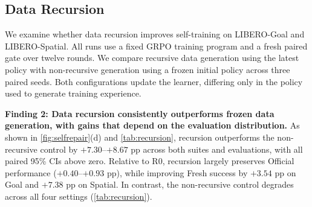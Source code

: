 \subsection{Data Recursion}
\label{sec:rq2}
We examine whether data recursion improves self-training on LIBERO-Goal and LIBERO-Spatial. All runs use a fixed GRPO training program and a fresh paired gate over twelve rounds. We compare recursive data generation using the latest policy with non-recursive generation using a frozen initial policy across three paired seeds. Both configurations update the learner, differing only in the policy used to generate training experience.

\indent\textbf{Finding 2: Data recursion consistently
outperforms frozen data generation, with gains that
depend on the evaluation distribution.}
As shown in \cref{fig:selfrepair}(d) and
\cref{tab:recursion}, recursion outperforms the
non-recursive control by $+7.30$--$+8.67$ pp across
both suites and evaluations, with all paired 95\% CIs
above zero. Relative to R0, recursion largely preserves
Official performance ($+0.40$--$+0.93$ pp), while
improving Fresh success by $+3.54$ pp on Goal and
$+7.38$ pp on Spatial. In contrast, the non-recursive
control degrades across all four settings
(\cref{tab:recursion}).

\begin{table}[t]
\centering
\small
\setlength{\tabcolsep}{3pt}
\caption{\textbf{Data recursion over 12 rounds.}
Changes relative to R0 and final paired advantages
(pp; 95\% CI). R0 changes use single Official
evaluations or the shared Fresh reference;
final Official advantages use three evaluations
per seed.}
\label{tab:recursion}
\end{table}

